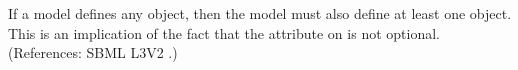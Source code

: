If a model defines any \Species object, then the model must also define at
least one \Compartment object.  This is an implication of the fact that the
 attribute on \Species is not optional.  (References:
SBML L3V2 .)

